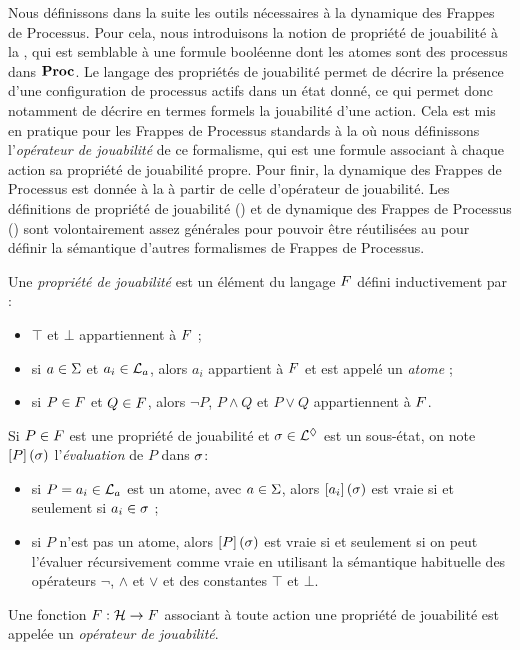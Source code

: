 Nous définissons dans la suite les outils nécessaires à la dynamique des Frappes de Processus.
Pour cela, nous introduisons la notion de propriété de jouabilité à la ,
qui est semblable à une formule booléenne dont les atomes sont des processus dans $\mathbf{Proc}$.
Le langage des propriétés de jouabilité permet de décrire la présence d'une configuration
de processus actifs dans un état donné, ce qui
permet donc notamment de décrire en termes formels la jouabilité d'une action.
Cela est mis en pratique pour les Frappes de Processus standards à la 
où nous définissons l'\emph{opérateur de jouabilité} de ce formalisme,
qui est une formule associant à chaque action sa propriété de jouabilité propre.
Pour finir, la dynamique des Frappes de Processus est donnée à la 
à partir de celle d'opérateur de jouabilité.
Les définitions de propriété de jouabilité () et de dynamique des Frappes de Processus
() sont volontairement assez générales pour pouvoir être réutilisées au
 pour définir la sémantique d'autres formalismes de Frappes de Processus.

\begin{definition}
  \label{def:ppl}
  Une \emph{propriété de jouabilité} est un élément du langage $F$ défini inductivement
   par :
  \begin{itemize}
    \item $\top$ et $\bot$ appartiennent à $F$ ;
    \item si $a \in \Sigma$ et $a_i \in \mathcal{L}_a$, alors $a_i$ appartient à $F$
      et est appelé un \emph{atome} ;
    \item si $P \in F$ et $Q \in F$,
      alors $\neg P$, $P \wedge Q$ et $P \vee Q$ appartiennent à $F$.
  \end{itemize}
%
  Si $P \in F$ est une propriété de jouabilité et $\sigma \in \mathcal{L}^\lozenge$ est un sous-état,
  on note $\left[P\right](\sigma)$ l'\emph{évaluation} de $P$ dans $\sigma$:
  \begin{itemize}
    \item si $P = a_i \in \mathcal{L}_a$ est un atome, avec $a \in \Sigma$,
      alors $\left[a_i\right](\sigma)$ est vraie si et seulement si $a_i \in \sigma$ ;
    \item si $P$ n'est pas un atome, alors $\left[P\right](\sigma)$ est vraie si et seulement si
      on peut l'évaluer récursivement comme vraie en utilisant la sémantique habituelle des
      opérateurs $\neg$, $\wedge$ et $\vee$ et des constantes $\top$ et $\bot$.
  \end{itemize}
%
  Une fonction $F : \mathcal{H} \rightarrow F$ associant à toute action une propriété de jouabilité
  est appelée un \emph{opérateur de jouabilité}.
\end{definition}

